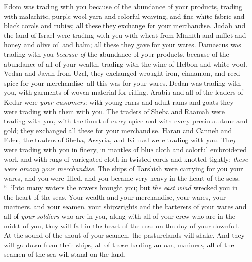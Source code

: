 \begin{biblechapter}
\verse Edom was trading with you because of the abundance of your products, trading with malachite, purple wool yarn and colorful weaving, and fine white fabric and black corals and rubies; all these they exchange for your merchandise.
\verse Judah and the land of Israel were trading with you with wheat from Minnith and millet and honey and olive oil and balm; all these they gave for your wares.
\verse Damascus was trading with you \textit{because of} the abundance of your products, because of the abundance of all of your wealth, trading with the wine of Helbon and white wool.
\verse Vedan and Javan from Uzal, they exchanged wrought iron, cinnamon, and reed spice for your merchandise; all this was for your wares.
\verse Dedan was trading with you, with garments of woven material for riding.
\verse Arabia and all of the leaders of Kedar were \textit{your customers}; with young rams and adult rams and goats they were trading with them with you.
\verse The traders of Sheba and Raamah were trading with you, with the finest of every spice and with every precious stone and gold; they exchanged all these for your merchandise.
\verse Haran and Canneh and Eden, the traders of Sheba, Assyria, and Kilmad were trading with you.
\verse They were trading with you in finery, in mantles of blue cloth and colorful embroidered work and with rugs of variegated cloth in twisted cords and knotted tightly; \textit{these were among your merchandise}.
\verse The ships of Tarshish were carrying for you your wares, and you were filled, and you became very heavy in the heart of the seas.
\verse “ ‘Into many waters 
the rowers brought you; 
but \textit{the east wind} wrecked you 
in the heart of the seas.
\verse Your wealth and your merchandise, your wares, 
your mariners, and your seamen, 
your shipwrights and the barterers of your wares 
and all of \textit{your soldiers} who are in you, 
along with all of your crew who are in the midst of you, 
they will fall in the heart of the seas on the day of your downfall.
\verse At the sound of the shout of your seamen, 
the pasturelands will shake.
\verse And they will go down from their ships, 
all of those holding an oar, 
mariners, all of the seamen of the sea 
will stand on the land,

\end{biblechapter}
